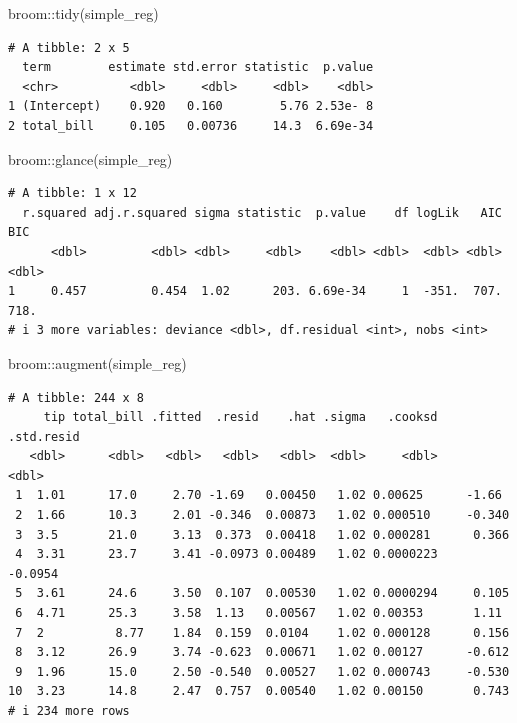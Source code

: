 \documentclass[
  letterpaper,
  DIV=11,
  numbers=noendperiod]{scrreprt}
\newenvironment{Shaded}{\begin{snugshade}}{\end{snugshade}}
\newcommand{\FunctionTok}[1]{\textcolor[rgb]{0.28,0.35,0.67}{#1}}
\newcommand{\NormalTok}[1]{\textcolor[rgb]{0.00,0.23,0.31}{#1}}
\newcommand{\SpecialCharTok}[1]{\textcolor[rgb]{0.37,0.37,0.37}{#1}}
\begin{document}
\begin{Shaded}
\begin{Highlighting}[]
\NormalTok{broom}\SpecialCharTok{::}\FunctionTok{tidy}\NormalTok{(simple\_reg)}
\end{Highlighting}
\end{Shaded}

\begin{verbatim}
# A tibble: 2 x 5
  term        estimate std.error statistic  p.value
  <chr>          <dbl>     <dbl>     <dbl>    <dbl>
1 (Intercept)    0.920   0.160        5.76 2.53e- 8
2 total_bill     0.105   0.00736     14.3  6.69e-34
\end{verbatim}

\begin{Shaded}
\begin{Highlighting}[]
\NormalTok{broom}\SpecialCharTok{::}\FunctionTok{glance}\NormalTok{(simple\_reg)}
\end{Highlighting}
\end{Shaded}

\begin{verbatim}
# A tibble: 1 x 12
  r.squared adj.r.squared sigma statistic  p.value    df logLik   AIC   BIC
      <dbl>         <dbl> <dbl>     <dbl>    <dbl> <dbl>  <dbl> <dbl> <dbl>
1     0.457         0.454  1.02      203. 6.69e-34     1  -351.  707.  718.
# i 3 more variables: deviance <dbl>, df.residual <int>, nobs <int>
\end{verbatim}

\begin{Shaded}
\begin{Highlighting}[]
\NormalTok{broom}\SpecialCharTok{::}\FunctionTok{augment}\NormalTok{(simple\_reg)}
\end{Highlighting}
\end{Shaded}

\begin{verbatim}
# A tibble: 244 x 8
     tip total_bill .fitted  .resid    .hat .sigma   .cooksd .std.resid
   <dbl>      <dbl>   <dbl>   <dbl>   <dbl>  <dbl>     <dbl>      <dbl>
 1  1.01      17.0     2.70 -1.69   0.00450   1.02 0.00625      -1.66  
 2  1.66      10.3     2.01 -0.346  0.00873   1.02 0.000510     -0.340 
 3  3.5       21.0     3.13  0.373  0.00418   1.02 0.000281      0.366 
 4  3.31      23.7     3.41 -0.0973 0.00489   1.02 0.0000223    -0.0954
 5  3.61      24.6     3.50  0.107  0.00530   1.02 0.0000294     0.105 
 6  4.71      25.3     3.58  1.13   0.00567   1.02 0.00353       1.11  
 7  2          8.77    1.84  0.159  0.0104    1.02 0.000128      0.156 
 8  3.12      26.9     3.74 -0.623  0.00671   1.02 0.00127      -0.612 
 9  1.96      15.0     2.50 -0.540  0.00527   1.02 0.000743     -0.530 
10  3.23      14.8     2.47  0.757  0.00540   1.02 0.00150       0.743 
# i 234 more rows
\end{verbatim}
\end{document}
